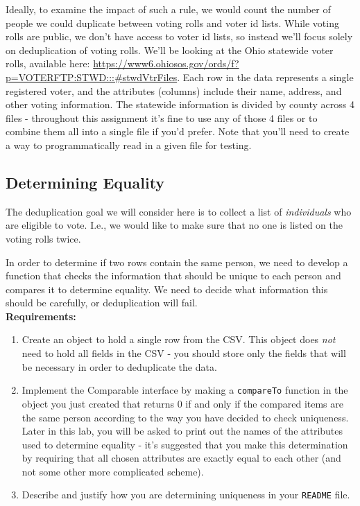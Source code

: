 \documentclass[12pt]{article}
\begin{document}
Ideally, to examine the impact of such a rule, we would count the number of people we could duplicate between voting rolls and voter id lists.  While voting rolls are public, we don't have access to voter id lists, so instead we'll focus solely on deduplication of voting rolls.  We'll be looking at the Ohio statewide voter rolls, available here: \url{https://www6.ohiosos.gov/ords/f?p=VOTERFTP:STWD:::#stwdVtrFiles}.  Each row in the data represents a single registered voter, and the attributes (columns) include their name, address, and other voting information.  The statewide information is divided by county across 4 files - throughout this assignment it's fine to use any of those 4 files or to combine them all into a single file if you'd prefer.  Note that you'll need to create a way to programmatically read in a given file for testing.


\subsection{Determining Equality}

The deduplication goal we will consider here is to collect a list of \emph{individuals} who are eligible to vote.  I.e., we would like to make sure that no one is listed on the voting rolls twice.

In order to determine if two rows contain the same person, we need to develop a function that checks the information that should be unique to each person and compares it to determine equality. We need to decide what information this should be carefully, or deduplication will fail. \\

\textbf{Requirements:}
\begin{enumerate}
\item Create an object to hold a single row from the CSV.  This object does \emph{not} need to hold all fields in the CSV - you should store only the fields that will be necessary in order to deduplicate the data.
\item Implement the Comparable interface by making a \verb+compareTo+ function in the object you just created that returns 0 if and only if the compared items are the same person according to the way you have decided to check uniqueness.  Later in this lab, you will be asked to print out the names of the attributes used to determine equality - it's suggested that you make this determination by requiring that all chosen attributes are exactly equal to each other (and not some other more complicated scheme).
\item Describe and justify how you are determining uniqueness in your \verb+README+ file.
\end{enumerate}
\end{document}
